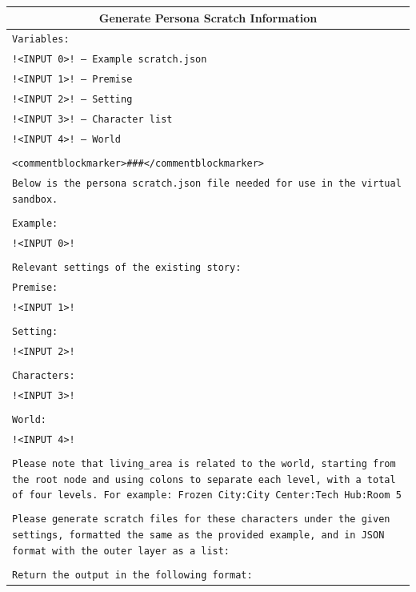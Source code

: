 \documentclass[letterpaper]{article} %
\begin{document}
\begin{small}
\begin{longtable}{p{\textwidth}}
    \multicolumn{1}{c}{\textbf{Generate Persona Scratch Information}} \\
    \midrule

    \texttt{Variables:} \\
    \texttt{!<INPUT 0>! -- Example scratch.json} \\
    \texttt{!<INPUT 1>! -- Premise} \\
    \texttt{!<INPUT 2>! -- Setting} \\
    \texttt{!<INPUT 3>! -- Character list} \\
    \texttt{!<INPUT 4>! -- World} \\
    \\
    \texttt{<commentblockmarker>\#\#\#</commentblockmarker>} \\
    \texttt{Below is the persona scratch.json file needed for use in the virtual sandbox.} \\
    \\
    \texttt{Example:} \\
    \texttt{!<INPUT 0>!} \\
    \\
    \texttt{Relevant settings of the existing story:} \\
    \texttt{Premise:} \\
    \texttt{!<INPUT 1>!} \\
    \\
    \texttt{Setting:} \\
    \texttt{!<INPUT 2>!} \\
    \\
    \texttt{Characters:} \\
    \texttt{!<INPUT 3>!} \\
    \\
    \texttt{World:} \\
    \texttt{!<INPUT 4>!} \\
    \\
    \texttt{Please note that living\_area is related to the world, starting from the root node and using colons to separate each level, with a total of four levels. For example: Frozen City:City Center:Tech Hub:Room 5} \\
    \\
    \texttt{Please generate scratch files for these characters under the given settings, formatted the same as the provided example, and in JSON format with the outer layer as a list:} \\
    \\
    \texttt{Return the output in the following format:} \\

\end{longtable}
\end{small}
\end{document}

